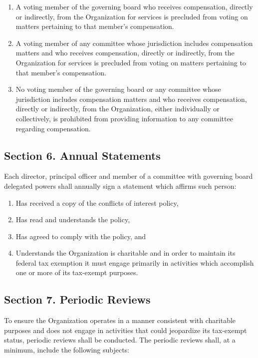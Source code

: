 \documentclass[a4paper]{article}
\begin{document}
\begin{enumerate}
\item A voting member of the governing board who receives compensation, directly or indirectly, from the Organization for services is precluded from voting on matters pertaining to that member's compensation.
\item A voting member of any committee whose jurisdiction includes compensation matters and who receives compensation, directly or indirectly, from the Organization for services is precluded from voting on matters pertaining to that member's compensation.
\item No voting member of the governing board or any committee whose jurisdiction includes compensation matters and who receives compensation, directly or indirectly, from the Organization, either individually or collectively, is prohibited from providing information to any committee regarding compensation.
\end{enumerate}

\subsection*{Section 6. Annual Statements}

Each director, principal officer and member of a committee with governing board delegated powers shall annually sign a statement which affirms such person:

\begin{enumerate}
\item Has received a copy of the conflicts of interest policy,
\item Has read and understands the policy,
\item Has agreed to comply with the policy, and
\item Understands the Organization is charitable and in order to maintain its federal tax exemption it must engage primarily in activities which accomplish one or more of its tax-exempt purposes.
\end{enumerate}

\subsection*{Section 7. Periodic Reviews}

To ensure the Organization operates in a manner consistent with charitable purposes and does not engage in activities that could jeopardize its tax-exempt status, periodic reviews shall be conducted. The periodic reviews shall, at a minimum, include the following subjects:
\end{document}

